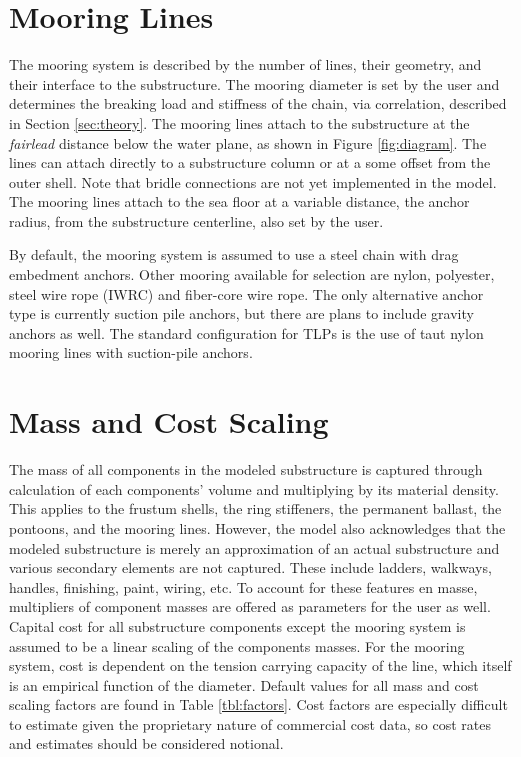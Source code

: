 \section{Mooring Lines}
The mooring system is described by the number of lines, their geometry,
and their interface to the substructure.  The mooring diameter is set by
the user and determines the breaking load and stiffness of the chain,
via correlation, described in Section \ref{sec:theory}.  The mooring
lines attach to the substructure at the \textit{fairlead} distance below
the water plane, as shown in Figure \ref{fig:diagram}.  The lines can
attach directly to a substructure column or at a some offset from the
outer shell.  Note that bridle connections are not yet implemented in
the model.  The mooring lines attach to the sea floor at a variable
distance, the anchor radius, from the substructure centerline, also set
by the user.

By default, the mooring system is assumed to use a steel chain with drag
embedment anchors. Other mooring available for selection are nylon,
polyester, steel wire rope (IWRC) and fiber-core wire rope.  The only
alternative anchor type is currently suction pile anchors, but there are
plans to include gravity anchors as well.  The standard configuration
for TLPs is the use of taut nylon mooring lines with suction-pile
anchors.

\section{Mass and Cost Scaling}
The mass of all components in the modeled substructure is captured
through calculation of each components' volume and multiplying by its material
density.  This applies to the frustum shells, the ring stiffeners, the
permanent ballast, the pontoons, and the mooring lines.
However, the model also acknowledges that the modeled substructure is
merely an approximation of an actual substructure and various secondary
elements are not captured.  These include ladders, walkways, handles,
finishing, paint, wiring, etc.  To account for these features en masse,
multipliers of component masses are offered as parameters for the user
as well.  Capital cost for all substructure components except the
mooring system is assumed to be a linear scaling of the components
masses.  For the mooring system, cost is dependent on the tension
carrying capacity of the line, which itself is an empirical function of
the diameter.  Default values for all mass and cost scaling factors are
found in Table \ref{tbl:factors}.  Cost factors are especially difficult to
estimate given the proprietary nature of commercial cost data, so
cost rates and estimates should be considered notional.

